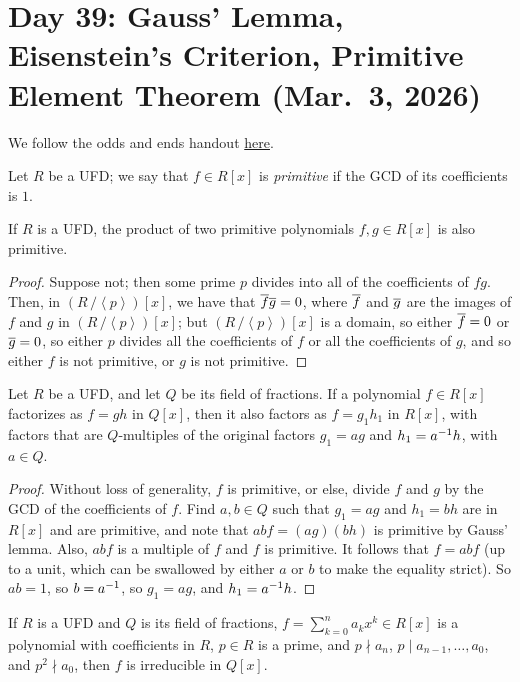 \section{Day 39: Gauss' Lemma, Eisenstein's Criterion, Primitive Element Theorem (Mar.\ 3, 2026)}
We follow the odds and ends handout \href{https://drorbn.net/AcademicPensieve/Classes/25-347-GroupsRingsFields/OddsAndEnds.pdf}{here}.
\begin{definition}
    Let $R$ be a UFD; we say that $f \in R[x]$ is \textit{primitive} if the GCD of its coefficients is $1$.
\end{definition}
\begin{lemma}
    If $R$ is a UFD, the product of two primitive polynomials $f, g \in R[x]$ is also primitive.
\end{lemma}
\begin{proof}
    Suppose not; then some prime $p$ divides into all of the coefficients of $f g$. Then, in $(R\,/\!\left<p\right>)[x]$, we have that $\overline f \overline g = 0$, where $\overline f$ and $\overline g$ are the images of $f$ and $g$ in $(R\,/\!\left<p\right>)[x]$; but $(R\,/\!\left<p\right>)[x]$ is a domain, so either $\overline f = 0$ or $\overline g = 0$, so either $p$ divides all the coefficients of $f$ or all the coefficients of $g$, and so either $f$ is not primitive, or $g$ is not primitive.
\end{proof}
\begin{corollary}
    Let $R$ be a UFD, and let $Q$ be its field of fractions. If a polynomial $f \in R[x]$ factorizes as $f = gh$ in $Q[x]$, then it also factors as $f = g_1 h_1$ in $R[x]$, with factors that are $Q$-multiples of the original factors $g_1 = ag$ and $h_1 = a^{-1} h$, with $a \in Q$.
\end{corollary}
\begin{proof}
    Without loss of generality, $f$ is primitive, or else, divide $f$ and $g$ by the GCD of the coefficients of $f$. Find $a, b \in Q$ such that $g_1 = ag$ and $h_1 = bh$ are in $R[x]$ and are primitive, and note that $abf = (ag)(bh)$ is primitive by Gauss' lemma. Also, $abf$ is a multiple of $f$ and $f$ is primitive. It follows that $f = abf$ (up to a unit, which can be swallowed by either $a$ or $b$ to make the equality strict). So $ab = 1$, so $b = a^{-1}$, so $g_1 = ag$, and $h_1 = a^{-1} h$.
\end{proof}
\begin{theorem}[Eisenstein]
    If $R$ is a UFD and $Q$ is its field of fractions, $f = \sum_{k=0}^n a_k x^k \in R[x]$ is a polynomial with coefficients in $R$, $p \in R$ is a prime, and $p \nmid a_n$, $p \mid a_{n-1}, \dots, a_0$, and $p^2 \nmid a_0$, then $f$ is irreducible in $Q[x]$.
\end{theorem}
